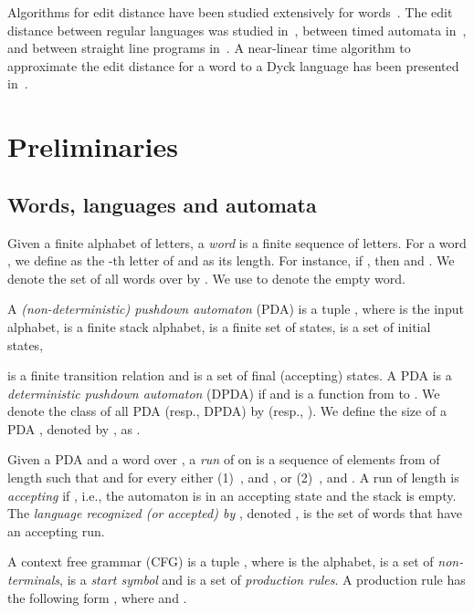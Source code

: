 \documentclass{CSML}
\begin{document}
\smallskip{}
Algorithms for edit distance have been studied extensively for words~\cite{levenshtein1966binary,AhoPeterson,Okuda,Pighizzini,Karp,Mohri}.
The edit distance between regular languages was studied in~\cite{riveros,boundedRiveros},
between timed automata in~\cite{timedEdit}, and between straight line programs 
in~\cite{lifshits2007processing,DBLP:conf/spire/Gawrychowski12}. 
A near-linear time algorithm to approximate the edit distance for a word to a 
{\sc Dyck} language has been presented in~\cite{Saha14}.

 


\section{Preliminaries}
\makeatletter{}\subsection{Words, languages and automata}
\newcommand{\dTree}{\mathcal{D}}

Given a finite alphabet  of letters, a \emph{word}  is a finite sequence 
of letters.
For a word , we define  as the -th letter of  and  
as its length.
For instance, if , then  and .
We denote the set of all words over  by .
We use  to denote the empty word.

A \emph{(non-deterministic) pushdown automaton} (PDA) is a tuple 
, where 
 is the input alphabet, 
 is a finite stack alphabet,  is a finite set of states, 
 is a set of initial states, 

is a finite transition relation and  is a set of final 
(accepting) states. 
A PDA  is a \emph{deterministic pushdown automaton} (DPDA)
if  and  is a function from  to .
We denote the class of all PDA (resp., DPDA) by  (resp., ).
We define the size of a PDA , denoted by ,
 as .

 Given a PDA  and a word  over ,
a \emph{run}  of  on  is a sequence of elements from 
 of length  such that
 and for every
 either (1)~,
 and , or 
(2)~,
 and .
A run  of length  is \emph{accepting} if , i.e.,
the automaton is in an accepting state and the stack is empty. The \emph{language recognized (or accepted) by }, denoted , is the set of words that have an accepting run.

A context free grammar (CFG) is a tuple , where  is the alphabet,  is a set of {\em non-terminals},  is a {\em start symbol} and  is a set of {\em production rules}.
A production rule  has the following form , where  and .
\end{document}
